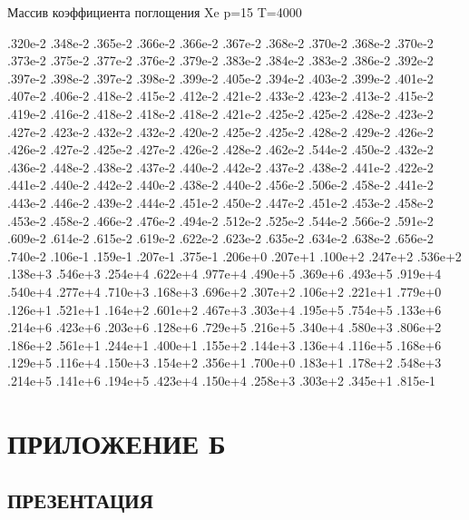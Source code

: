 \noindent Массив коэффициента поглощения Xe p=15 T=4000

\noindent .320e‑2 .348e‑2 .365e‑2 .366e‑2 .366e‑2 .367e‑2 .368e‑2 .370e‑2 .368e‑2 .370e‑2 .373e‑2 .375e‑2 .377e‑2 .376e‑2 .379e‑2 .383e‑2 .384e‑2 .383e‑2 .386e‑2 .392e‑2 .397e‑2 .398e‑2 .397e‑2 .398e‑2 .399e‑2 .405e‑2 .394e‑2 .403e‑2 .399e‑2 .401e‑2 .407e‑2 .406e‑2 .418e‑2 .415e‑2 .412e‑2 .421e‑2 .433e‑2 .423e‑2 .413e‑2 .415e‑2 .419e‑2 .416e‑2 .418e‑2 .418e‑2 .418e‑2 .421e‑2 .425e‑2 .425e‑2 .428e‑2 .423e‑2 .427e‑2 .423e‑2 .432e‑2 .432e‑2 .420e‑2 .425e‑2 .425e‑2 .428e‑2 .429e‑2 .426e‑2 .426e‑2 .427e‑2 .425e‑2 .427e‑2 .426e‑2 .428e‑2 .462e‑2 .544e‑2 .450e‑2 .432e‑2 .436e‑2 .448e‑2 .438e‑2 .437e‑2 .440e‑2 .442e‑2 .437e‑2 .438e‑2 .441e‑2 .422e‑2 .441e‑2 .440e‑2 .442e‑2 .440e‑2 .438e‑2 .440e‑2 .456e‑2 .506e‑2 .458e‑2 .441e‑2 .443e‑2 .446e‑2 .439e‑2 .444e‑2 .451e‑2 .450e‑2 .447e‑2 .451e‑2 .453e‑2 .458e‑2 .453e‑2 .458e‑2 .466e‑2 .476e‑2 .494e‑2 .512e‑2 .525e‑2 .544e‑2 .566e‑2 .591e‑2 .609e‑2 .614e‑2 .615e‑2 .619e‑2 .622e‑2 .623e‑2 .635e‑2 .634e‑2 .638e‑2 .656e‑2 .740e‑2 .106e‑1 .159e‑1 .207e‑1 .375e‑1 .206e+0 .207e+1 .100e+2 .247e+2 .536e+2 .138e+3 .546e+3 .254e+4 .622e+4 .977e+4 .490e+5 .369e+6 .493e+5 .919e+4 .540e+4 .277e+4 .710e+3 .168e+3 .696e+2 .307e+2 .106e+2 .221e+1 .779e+0 .126e+1 .521e+1 .164e+2 .601e+2 .467e+3 .303e+4 .195e+5 .754e+5 .133e+6 .214e+6 .423e+6 .203e+6 .128e+6 .729e+5 .216e+5 .340e+4 .580e+3 .806e+2 .186e+2 .561e+1 .244e+1 .400e+1 .155e+2 .144e+3 .136e+4 .116e+5 .168e+6 .129e+5 .116e+4 .150e+3 .154e+2 .356e+1 .700e+0 .183e+1 .178e+2 .548e+3 .214e+5 .141e+6 .194e+5 .423e+4 .150e+4 .258e+3 .303e+2 .345e+1 .815e‑1

\chapter*{ПРИЛОЖЕНИЕ Б}\label{toc:attachment-b}
\titleformat{\section}{\bigsize\centering\bfseries}{\thesection}{}{}{}{}
\section*{ПРЕЗЕНТАЦИЯ}

